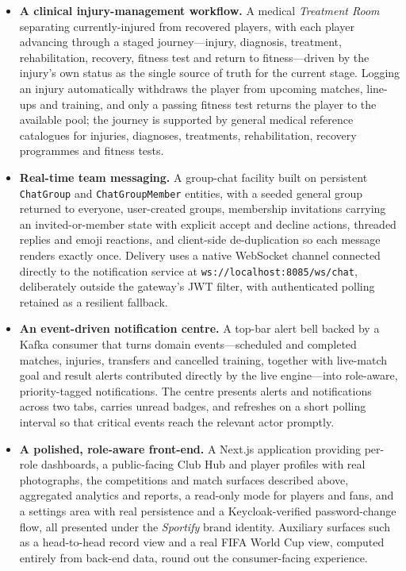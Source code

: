\begin{itemize}
  \item \textbf{A clinical injury-management workflow.} A medical \emph{Treatment Room}
        separating currently-injured from recovered players, with each player advancing
        through a staged journey---injury, diagnosis, treatment, rehabilitation, recovery,
        fitness test and return to fitness---driven by the injury's own status as the single
        source of truth for the current stage. Logging an injury automatically withdraws the
        player from upcoming matches, line-ups and training, and only a passing fitness test
        returns the player to the available pool; the journey is supported by general
        medical reference catalogues for injuries, diagnoses, treatments, rehabilitation,
        recovery programmes and fitness tests.

  \item \textbf{Real-time team messaging.} A group-chat facility built on persistent
        \texttt{ChatGroup} and \texttt{ChatGroupMember} entities, with a seeded general
        group returned to everyone, user-created groups, membership invitations carrying an
        invited-or-member state with explicit accept and decline actions, threaded replies
        and emoji reactions, and client-side de-duplication so each message renders exactly
        once. Delivery uses a native WebSocket channel connected directly to the
        notification service at \texttt{ws://localhost:8085/ws/chat}, deliberately outside
        the gateway's JWT filter, with authenticated polling retained as a resilient
        fallback.

  \item \textbf{An event-driven notification centre.} A top-bar alert bell backed by a
        Kafka consumer that turns domain events---scheduled and completed matches,
        injuries, transfers and cancelled training, together with live-match goal and
        result alerts contributed directly by the live engine---into role-aware,
        priority-tagged notifications. The centre presents alerts and notifications across
        two tabs, carries unread badges, and refreshes on a short polling interval so that
        critical events reach the relevant actor promptly.

  \item \textbf{A polished, role-aware front-end.} A Next.js application providing
        per-role dashboards, a public-facing Club Hub and player profiles with real
        photographs, the competitions and match surfaces described above, aggregated
        analytics and reports, a read-only mode for players and fans, and a settings area
        with real persistence and a Keycloak-verified password-change flow, all presented
        under the \textit{Sportify} brand identity. Auxiliary surfaces such as a head-to-head
        record view and a real FIFA World Cup view, computed entirely from back-end data,
        round out the consumer-facing experience.


\end{itemize}
